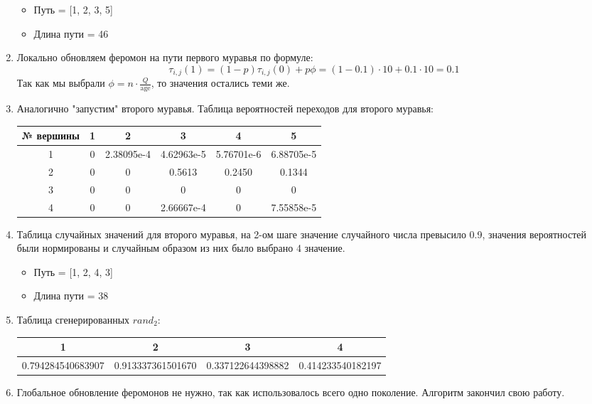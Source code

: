 \documentclass[14pt]{article}
\begin{document}
\begin{enumerate}
    \begin{itemize}
        \item Путь = [1, 2, 3, 5]
        \item Длина пути = 46
    \end{itemize}
    
    \item Локально обновляем феромон на пути первого муравья по формуле:
    \[
    \tau_{i,j}(1) = (1 - p) \tau_{i,j}(0) + p \phi = (1 - 0.1) \cdot 10 + 0.1 \cdot 10 = 0.1
    \]
    Так как мы выбрали $\phi = n \cdot \frac{Q}{\text{age}}$, то значения остались теми же.
    
    \item Аналогично "запустим" второго муравья. Таблица вероятностей переходов для второго муравья:\\
    \begin{tabular}{|c|c|c|c|c|c|}
        \hline
        № вершины & 1 & 2 & 3 & 4 & 5 \\
        \hline
        1 & 0 & 2.38095e-4 & 4.62963e-5 & 5.76701e-6 & 6.88705e-5 \\
        2 & 0 & 0 & 0.5613 & 0.2450 & 0.1344 \\
        3 & 0 & 0 & 0 & 0 & 0 \\
        4 & 0 & 0 & 2.66667e-4 & 0 & 7.55858e-5 \\
        \hline
    \end{tabular}
    
    \item Таблица случайных значений для второго муравья, на 2-ом шаге значение случайного числа превысило 0.9, значения вероятностей были нормированы и случайным образом из них было выбрано 4 значение.
    
    \begin{itemize}
        \item Путь = [1, 2, 4, 3]
        \item Длина пути = 38
    \end{itemize}
    
    \item Таблица сгенерированных $rand_2$:\\
    \begin{tabular}{|c|c|c|c|}
        \hline
        1 & 2 & 3 & 4 \\
        \hline
        0.794284540683907 & 0.913337361501670 & 0.337122644398882 & 0.414233540182197 \\
        \hline
    \end{tabular}
    
    \item Глобальное обновление феромонов не нужно, так как использовалось всего одно поколение. Алгоритм закончил свою работу.
\end{enumerate}
\end{document}
